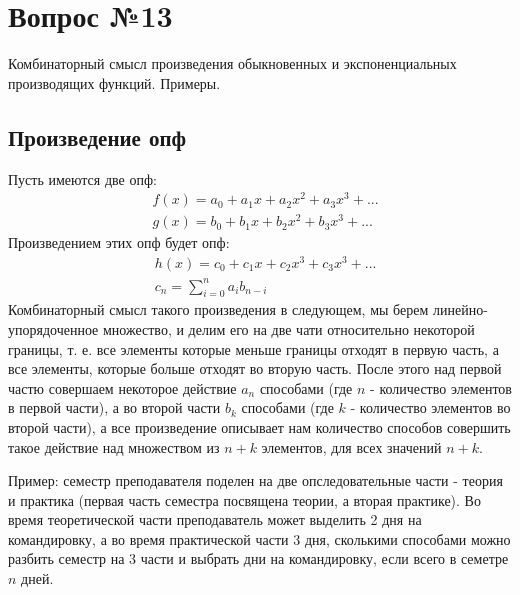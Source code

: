 \chapter{Вопрос №13}

Комбинаторный смысл произведения обыкновенных и экспоненциальных производящих функций. Примеры.

\section{Произведение опф}

Пусть имеются две опф:
\[
	\begin{split}
		&f\left(x\right) = a_0 + a_1 x + a_2 x^2 + a_3 x^3 + ... \\
		&g\left(x\right) = b_0 + b_1 x + b_2 x^2 + b_3 x^3 + ...
	\end{split}
\]
Произведением этих опф будет опф:
\[
	\begin{split}
		&h\left(x\right) = c_0 + c_1 x + c_2 x^3 + c_3 x^3 + ... \\
		& c_n = \sum_{i=0}^{n}a_ib_{n-i}
	\end{split}
\]
Комбинаторный смысл такого произведения в следующем, мы берем линейно-упорядоченное множество, и делим его на две чати относительно некоторой границы, т. е. все элементы которые меньше границы отходят в первую часть, а все элементы, которые больше отходят во вторую часть. После этого над первой частю совершаем некоторое действие $a_n$ способами (где $n$ - количество элементов в первой части), а во второй части $b_k$ способами (где $k$ - количество элементов во второй части), а все произведение описывает нам количество способов совершить такое действие над множеством из $n+k$ элементов, для всех значений $n+k$.

Пример: семестр преподавателя поделен на две опследовательные части - теория и практика (первая часть семестра посвящена теории, а вторая практике). Во время теоретической части преподаватель может выделить 2 дня на командировку, а во время практической части 3 дня, сколькими способами можно разбить семестр на 3 части и выбрать дни на командировку, если всего в семетре $n$ дней.

